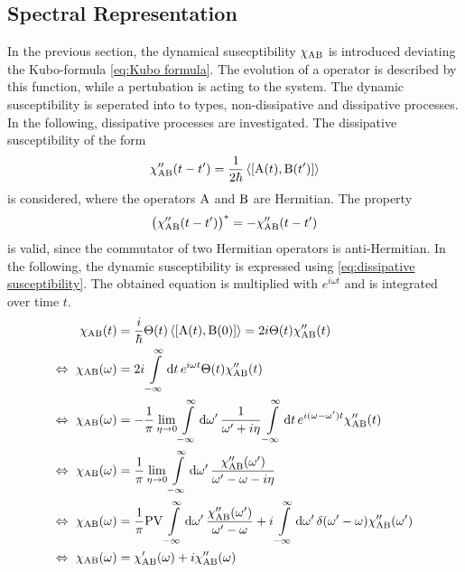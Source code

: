 \subsection{Spectral Representation}
\label{subsec:spectral representation}
%
%
In the previous section, the dynamical susecptibility $\chi_{\mathrm{AB}}$ is introduced deviating the Kubo-formula \eqref{eq:Kubo formula}.
The evolution of a operator is described by this function, while a pertubation is acting to the system.
The dynamic susceptibility is seperated into to types, non-dissipative and dissipative processes.
In the following, dissipative processes are investigated.
The dissipative susceptibility of the form
%
\begin{align}
	\chi''_{\mt{AB}}(t-t') = \frac{1}{2\hbar} \expval{\comm{\mt{A}(t)}{\mt{B}(t')}}
	\label{eq:dissipative susceptibility}
\end{align}
%
is considered, where the operators $\mathrm{A}$ and $\mathrm{B}$ are Hermitian.
The property
%
\begin{align}
	\big(\chi''_{\mathrm{AB}}(t-t')\big)^{*} = - \chi''_{\mathrm{AB}}(t-t')
	\label{eq:complex conjugated of dissipative susceptibility}
\end{align}
%
is valid, since the commutator of two Hermitian operators is anti-Hermitian.
In the following, the dynamic susceptibility is expressed using \eqref{eq:dissipative susceptibility}.
The obtained equation is multiplied with $e^{i\omega t}$ and is integrated over time $t$.
%
\begin{align}
	\chi_{\mt{AB}}(t) &= \frac{i}{\hbar} \Theta(t) \expval{\comm{\mt{A}(t)}{\mt{B}(0)}} = 2i \Theta(t) \chi''_{\mt{AB}}(t)
	\notag \\
	\Leftrightarrow\ \chi_{\mt{AB}}(\omega) &= 2i \int\limits_{-\infty}^{\infty} \dd{t} e^{i\omega t} \Theta(t) \chi''_{\mt{AB}}(t)
	\notag \\
	\Leftrightarrow\ \chi_{\mt{AB}}(\omega) &= -\frac{1}{\pi} \lim\limits_{\eta \to 0} \int\limits_{-\infty}^{\infty} \dd{\omega'}
 \frac{1}{\omega' + i\eta} \int\limits_{-\infty}^{\infty} \dd{t} e^{i(\omega-\omega')t} \chi''_{\mt{AB}}(t)
 	\notag \\
	\Leftrightarrow\ \chi_{\mt{AB}}(\omega) &= \frac{1}{\pi} \lim\limits_{\eta \to 0} \int\limits_{-\infty}^{\infty} \dd{\omega'}
 \frac{\chi''_{\mt{AB}}(\omega')}{\omega' - \omega - i\eta} 
 	\notag \\
	\Leftrightarrow\ \chi_{\mt{AB}}(\omega) &= \frac{1}{\pi} \mt{PV} \int\limits_{-\infty}^{\infty} \dd{\omega'}
 \frac{\chi''_{\mt{AB}}(\omega')}{\omega' - \omega} + i \int\limits_{-\infty}^{\infty} \dd{\omega'} \delta(\omega' - \omega) \chi''_{\mt{AB}}(\omega')
 	\notag \\
	\Leftrightarrow\ \chi_{\mt{AB}}(\omega) &= \chi'_{\mt{AB}}(\omega) + i \chi''_{\mt{AB}}(\omega)
	\label{eq:splitting susceptibility into real and imaginary part}
\end{align}
